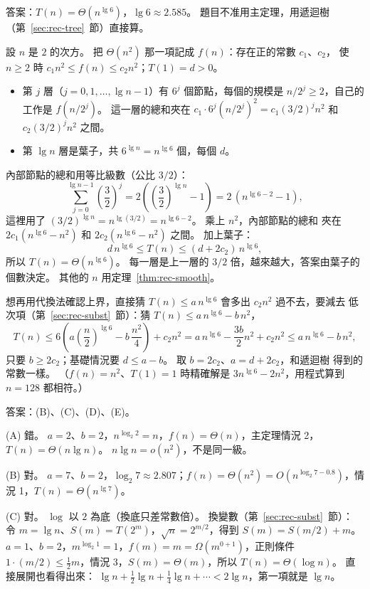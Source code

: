 答案：$T(n) = \Theta(n^{\lg 6})$，$\lg 6 \approx 2.585$。 題目不准用主定理，用遞迴樹
（第~\ref{sec:rec-tree}~節）直接算。

設 $n$ 是 $2$ 的次方。 把 $\Theta(n^2)$ 那一項記成 $f(n)$：存在正的常數 $c_1$、$c_2$，
使 $n \ge 2$ 時 $c_1 n^2 \le f(n) \le c_2 n^2$；$T(1) = d > 0$。
\begin{itemize}
\item 第 $j$ 層（$j = 0, 1, \ldots, \lg n - 1$）有 $6^j$ 個節點，每個的規模是
$n/2^j \ge 2$，自己的工作是 $f(n/2^j)$。 這一層的總和夾在
$c_1 \cdot 6^j (n/2^j)^2 = c_1 (3/2)^j n^2$ 和 $c_2 (3/2)^j n^2$ 之間。
\item 第 $\lg n$ 層是葉子，共 $6^{\lg n} = n^{\lg 6}$ 個，每個 $d$。
\end{itemize}
內部節點的總和用等比級數（公比 $3/2$）：
\[
\sum_{j=0}^{\lg n - 1} \left(\frac{3}{2}\right)^j
= 2\left(\left(\frac{3}{2}\right)^{\lg n} - 1\right) = 2\,(n^{\lg 6 - 2} - 1),
\]
這裡用了 $(3/2)^{\lg n} = n^{\lg (3/2)} = n^{\lg 6 - 2}$。 乘上 $n^2$，內部節點的總和
夾在 $2c_1 (n^{\lg 6} - n^2)$ 和 $2c_2 (n^{\lg 6} - n^2)$ 之間。 加上葉子：
\[
d\, n^{\lg 6} \le T(n) \le (d + 2c_2)\, n^{\lg 6} ,
\]
所以 $T(n) = \Theta(n^{\lg 6})$。 每一層是上一層的 $3/2$ 倍，越來越大，答案由葉子的
個數決定。 其他的 $n$ 用定理~\ref{thm:rec-smooth}。

想再用代換法確認上界，直接猜 $T(n) \le a\, n^{\lg 6}$ 會多出 $c_2 n^2$ 過不去，要減去
低次項（第~\ref{sec:rec-subst}~節）：猜 $T(n) \le a\, n^{\lg 6} - b\, n^2$，
\[
T(n) \le 6\left(a \left(\frac{n}{2}\right)^{\lg 6} - b\, \frac{n^2}{4}\right) + c_2 n^2
= a\, n^{\lg 6} - \frac{3b}{2} n^2 + c_2 n^2 \le a\, n^{\lg 6} - b\, n^2 ,
\]
只要 $b \ge 2c_2$；基礎情況要 $d \le a - b$。 取 $b = 2c_2$、$a = d + 2c_2$，和遞迴樹
得到的常數一樣。 （$f(n) = n^2$、$T(1) = 1$ 時精確解是 $3n^{\lg 6} - 2n^2$，用程式算到
$n = 128$ 都相符。）

答案：(B)、(C)、(D)、(E)。

(A) 錯。 $a = 2$、$b = 2$，$n^{\log_2 2} = n$，$f(n) = \Theta(n)$，主定理情況 2，
$T(n) = \Theta(n \lg n)$。 $n \lg n = o(n^2)$，不是同一級。

(B) 對。 $a = 7$、$b = 2$，$\log_2 7 \approx 2.807$；$f(n) = \Theta(n^2) =
O(n^{\log_2 7 - 0.8})$，情況 1，$T(n) = \Theta(n^{\lg 7})$。

(C) 對。 $\log$ 以 $2$ 為底（換底只差常數倍）。 換變數（第~\ref{sec:rec-subst}~節）：
令 $m = \lg n$、$S(m) = T(2^m)$，$\sqrt{n} = 2^{m/2}$，得到 $S(m) = S(m/2) + m$。
$a = 1$、$b = 2$，$m^{\log_2 1} = 1$，$f(m) = m = \Omega(m^{0 + 1})$，正則條件
$1 \cdot (m/2) \le \frac{1}{2} m$，情況 3，$S(m) = \Theta(m)$，所以
$T(n) = \Theta(\log n)$。 直接展開也看得出來：
$\lg n + \frac{1}{2}\lg n + \frac{1}{4}\lg n + \cdots < 2\lg n$，第一項就是
$\lg n$。

